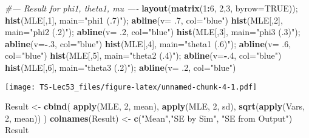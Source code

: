 \documentclass[]{article}
\newenvironment{Shaded}{\begin{snugshade}}{\end{snugshade}}
\newcommand{\CommentTok}[1]{\textcolor[rgb]{0.56,0.35,0.01}{\textit{#1}}}
\newcommand{\DataTypeTok}[1]{\textcolor[rgb]{0.13,0.29,0.53}{#1}}
\newcommand{\DecValTok}[1]{\textcolor[rgb]{0.00,0.00,0.81}{#1}}
\newcommand{\FloatTok}[1]{\textcolor[rgb]{0.00,0.00,0.81}{#1}}
\newcommand{\KeywordTok}[1]{\textcolor[rgb]{0.13,0.29,0.53}{\textbf{#1}}}
\newcommand{\NormalTok}[1]{#1}
\newcommand{\OperatorTok}[1]{\textcolor[rgb]{0.81,0.36,0.00}{\textbf{#1}}}
\newcommand{\OtherTok}[1]{\textcolor[rgb]{0.56,0.35,0.01}{#1}}
\newcommand{\StringTok}[1]{\textcolor[rgb]{0.31,0.60,0.02}{#1}}
\begin{document}
\begin{Shaded}
\begin{Highlighting}[]
  \CommentTok{#--- Result for phi1, theta1, mu ----}
  \KeywordTok{layout}\NormalTok{(}\KeywordTok{matrix}\NormalTok{(}\DecValTok{1}\OperatorTok{:}\DecValTok{6}\NormalTok{, }\DecValTok{2}\NormalTok{,}\DecValTok{3}\NormalTok{, }\DataTypeTok{byrow=}\OtherTok{TRUE}\NormalTok{)); }
  \KeywordTok{hist}\NormalTok{(MLE[,}\DecValTok{1}\NormalTok{], }\DataTypeTok{main=}\StringTok{"phi1 (.7)"}\NormalTok{);     }\KeywordTok{abline}\NormalTok{(}\DataTypeTok{v=} \FloatTok{.7}\NormalTok{, }\DataTypeTok{col=}\StringTok{"blue"}\NormalTok{)}
  \KeywordTok{hist}\NormalTok{(MLE[,}\DecValTok{2}\NormalTok{], }\DataTypeTok{main=}\StringTok{"phi2 (.2)"}\NormalTok{);     }\KeywordTok{abline}\NormalTok{(}\DataTypeTok{v=} \FloatTok{.2}\NormalTok{, }\DataTypeTok{col=}\StringTok{"blue"}\NormalTok{)}
  \KeywordTok{hist}\NormalTok{(MLE[,}\DecValTok{3}\NormalTok{], }\DataTypeTok{main=}\StringTok{"phi3 (.3)"}\NormalTok{);     }\KeywordTok{abline}\NormalTok{(}\DataTypeTok{v=}\OperatorTok{-}\NormalTok{.}\DecValTok{3}\NormalTok{, }\DataTypeTok{col=}\StringTok{"blue"}\NormalTok{)}
  \KeywordTok{hist}\NormalTok{(MLE[,}\DecValTok{4}\NormalTok{], }\DataTypeTok{main=}\StringTok{"theta1 (.6)"}\NormalTok{);   }\KeywordTok{abline}\NormalTok{(}\DataTypeTok{v=} \FloatTok{.6}\NormalTok{, }\DataTypeTok{col=}\StringTok{"blue"}\NormalTok{)}
  \KeywordTok{hist}\NormalTok{(MLE[,}\DecValTok{5}\NormalTok{], }\DataTypeTok{main=}\StringTok{"theta2 (.4)"}\NormalTok{);   }\KeywordTok{abline}\NormalTok{(}\DataTypeTok{v=}\OperatorTok{-}\NormalTok{.}\DecValTok{4}\NormalTok{, }\DataTypeTok{col=}\StringTok{"blue"}\NormalTok{)}
  \KeywordTok{hist}\NormalTok{(MLE[,}\DecValTok{6}\NormalTok{], }\DataTypeTok{main=}\StringTok{"theta3 (.2)"}\NormalTok{);   }\KeywordTok{abline}\NormalTok{(}\DataTypeTok{v=} \FloatTok{.2}\NormalTok{, }\DataTypeTok{col=}\StringTok{"blue"}\NormalTok{)}
\end{Highlighting}
\end{Shaded}

\texttt{[image: TS-Lec53\_files/figure-latex/unnamed-chunk-4-1.pdf]}

\begin{Shaded}
\begin{Highlighting}[]
\NormalTok{  Result <-}\StringTok{ }\KeywordTok{cbind}\NormalTok{( }\KeywordTok{apply}\NormalTok{(MLE, }\DecValTok{2}\NormalTok{, mean), }\KeywordTok{apply}\NormalTok{(MLE, }\DecValTok{2}\NormalTok{, sd), }\KeywordTok{sqrt}\NormalTok{(}\KeywordTok{apply}\NormalTok{(Vars, }\DecValTok{2}\NormalTok{, mean)) )}
  \KeywordTok{colnames}\NormalTok{(Result) <-}\StringTok{ }\KeywordTok{c}\NormalTok{(}\StringTok{"Mean"}\NormalTok{,}\StringTok{"SE by Sim"}\NormalTok{,  }\StringTok{"SE from Output"}\NormalTok{)}
\NormalTok{  Result}
\end{Highlighting}
\end{Shaded}
\end{document}
